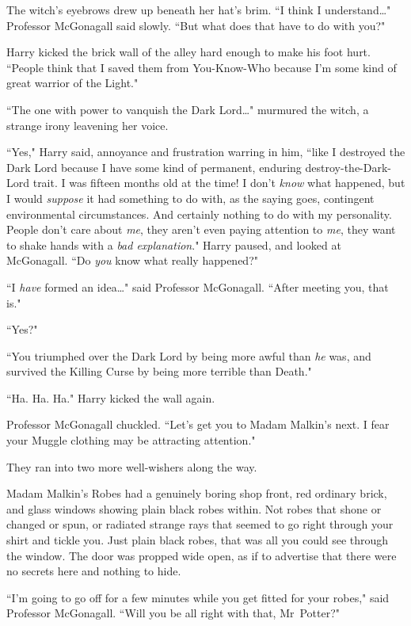 The witch's eyebrows drew up beneath her hat's brim. ``I think I understand{\ldots}" Professor McGonagall said slowly. ``But what does that have to do with you?"

Harry kicked the brick wall of the alley hard enough to make his foot hurt. ``People think that I saved them from You-Know-Who because I'm some kind of great warrior of the Light."

``The one with power to vanquish the Dark Lord{\ldots}" murmured the witch, a strange irony leavening her voice.

``Yes," Harry said, annoyance and frustration warring in him, ``like I destroyed the Dark Lord because I have some kind of permanent, enduring destroy-the-Dark-Lord trait. I was fifteen months old at the time! I don't \emph{know} what happened, but I would \emph{suppose} it had something to do with, as the saying goes, contingent environmental circumstances. And certainly nothing to do with my personality. People don't care about \emph{me}, they aren't even paying attention to \emph{me}, they want to shake hands with a \emph{bad explanation}." Harry paused, and looked at McGonagall. ``Do \emph{you} know what really happened?"

``I \emph{have} formed an idea{\ldots}" said Professor McGonagall. ``After meeting you, that is."

``Yes?"

``You triumphed over the Dark Lord by being more awful than \emph{he} was, and survived the Killing Curse by being more terrible than Death."

``Ha. Ha. Ha." Harry kicked the wall again.

Professor McGonagall chuckled. ``Let's get you to Madam Malkin's next. I fear your Muggle clothing may be attracting attention."

They ran into two more well-wishers along the way.

Madam Malkin's Robes had a genuinely boring shop front, red ordinary brick, and glass windows showing plain black robes within. Not robes that shone or changed or spun, or radiated strange rays that seemed to go right through your shirt and tickle you. Just plain black robes, that was all you could see through the window. The door was propped wide open, as if to advertise that there were no secrets here and nothing to hide.

``I'm going to go off for a few minutes while you get fitted for your robes," said Professor McGonagall. ``Will you be all right with that, Mr~Potter?"

